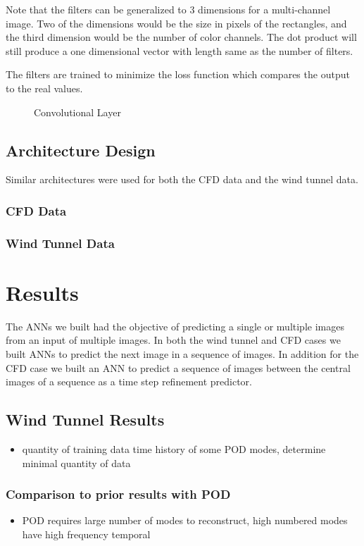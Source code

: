\documentclass{article}
\begin{document}
Note that the filters can be generalized to 3 dimensions for a multi-channel image. Two of the dimensions would be the size in pixels of the rectangles, and the third dimension would be the number of color channels.  The dot product will still produce a one dimensional vector with length same as the number of filters.

The filters are trained to minimize the loss function which compares the output to the real values.

\begin{figure}
    
    \caption{Convolutional Layer}
    \label{fig:convlayers}
\end{figure}

\subsection{Architecture Design}
Similar architectures were used for both the CFD data and the wind tunnel data.
\subsubsection{CFD Data}


\subsubsection{Wind Tunnel Data}

\section{Results}
The ANNs we built had the objective of predicting a single or multiple images from an input of multiple images.  In both the wind tunnel and CFD cases we built ANNs to predict the next image in a sequence of images.  In addition for the CFD case we built an ANN to predict a sequence of images between the central images of a sequence as a time step refinement predictor.

\subsection{Wind Tunnel Results}
\begin{itemize}
    \item   quantity of training data time history of some POD modes, determine minimal quantity of data
\end{itemize}

\subsubsection{Comparison to prior results with POD}
\begin{itemize}
    \item   POD requires large number of modes to reconstruct, high numbered modes have high frequency temporal 
\end{itemize}
\end{document}
